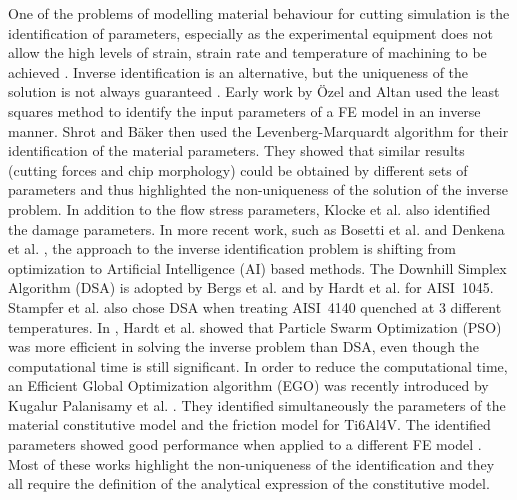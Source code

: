 \documentclass[preprint,12pt,times]{elsarticle}
\begin{document}
One of the problems of modelling material behaviour for cutting simulation is the identification of parameters, especially as the experimental equipment does not allow the high levels of strain, strain rate and temperature of machining to be achieved \cite{melkote_Advances_2017}. Inverse identification is an alternative, but the uniqueness of the solution is not always guaranteed \cite{arrazola_Recent_2013, melkote_Advances_2017}. Early work by Özel and Altan \cite{ozel_Determination_2000} used the least squares method to identify the input parameters of a FE model in an inverse manner. Shrot and Bäker \cite{shrot_Determination_2012} then used the Levenberg-Marquardt algorithm for their identification of the material parameters. They showed that similar results (cutting forces and chip morphology) could be obtained by different sets of parameters and thus highlighted the non-uniqueness of the solution of the inverse problem. In addition to the flow stress parameters, Klocke et al. \cite{klocke_Orthogonal_2013} also identified the damage parameters. In more recent work, such as Bosetti et al. \cite{bosetti_Identification_2013} and Denkena et al. \cite{denkena_Inverse_2015}, the approach to the inverse identification problem is shifting from optimization to Artificial Intelligence (AI) based methods. The Downhill Simplex Algorithm (DSA) is adopted by Bergs et al. \cite{bergs_Determination_2020} and by Hardt et al. \cite{hardt_Investigations_2021} for AISI~1045. Stampfer et al. \cite{stampfer_Material_2021} also chose DSA when treating AISI~4140 quenched at 3 different temperatures. In \cite{hardt_Application_2021}, Hardt et al. showed that Particle Swarm Optimization (PSO) was more efficient in solving the inverse problem than DSA, even though the computational time is still significant. In order to reduce the computational time, an Efficient Global Optimization algorithm (EGO) was recently introduced by Kugalur Palanisamy et al. \cite{kugalurpalanisamy_Identification_2022}. They identified simultaneously the parameters of the material constitutive model and the friction model for Ti6Al4V. The identified parameters showed good performance when applied to a different FE model \cite{ducobu_Application_2023}. Most of these works highlight the non-uniqueness of the identification and they all require the definition of the analytical expression of the constitutive model.
\end{document}
